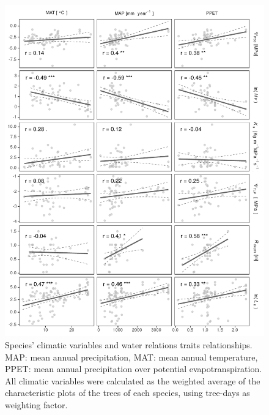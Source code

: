 \documentclass[11pt,twoside]{reedthesis}
\begin{document}
\begin{figure}[H]

{\centering \includegraphics[width=1\linewidth]{figure/appendixD/fig7} 

}

\caption[Species' climatic variables and water relations traits relationships.]{Species' climatic variables and water relations traits relationships. MAP: mean annual precipitation, MAT: mean annual temperature, PPET: mean annual precipitation over potential evapotranspiration. All climatic variables were calculated as the weighted average of the characteristic plots of the trees of each species, using tree-days as weighting factor.}\label{fig:climatetraitsplot}
\end{figure}
\end{document}
